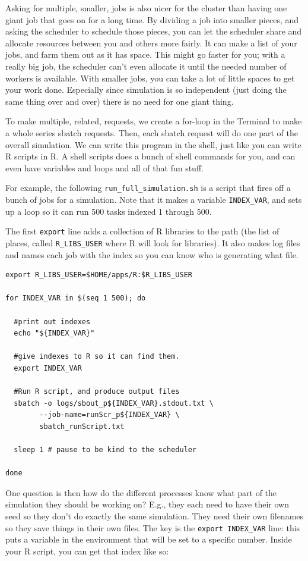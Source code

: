 \documentclass[
]{book}
\begin{document}
Asking for multiple, smaller, jobs is also nicer for the cluster than having one giant job that goes on for a long time.
By dividing a job into smaller pieces, and asking the scheduler to schedule those pieces, you can let the scheduler share and allocate resources between you and others more fairly.
It can make a list of your jobs, and farm them out as it has space.
This might go faster for you; with a really big job, the scheduler can't even allocate it until the needed number of workers is available.
With smaller jobs, you can take a lot of little spaces to get your work done.
Especially since simulation is so independent (just doing the same thing over and over) there is no need for one giant thing.

To make multiple, related, requests, we create a for-loop in the Terminal to make a whole series sbatch requests.
Then, each sbatch request will do one part of the overall simulation.
We can write this program in the shell, just like you can write R scripts in R.
A shell scripts does a bunch of shell commands for you, and can even have variables and loops and all of that fun stuff.

For example, the following \texttt{run\_full\_simulation.sh} is a script that fires off a bunch of jobs for a simulation.
Note that it makes a variable \texttt{INDEX\_VAR}, and sets up a loop so it can run 500 tasks indexed 1 through 500.

The first \texttt{export} line adds a collection of R libraries to the path (the list of places, called \texttt{R\_LIBS\_USER} where R will look for libraries).
It also makes log files and names each job with the index so you can know who is generating what file.

\begin{verbatim}
export R_LIBS_USER=$HOME/apps/R:$R_LIBS_USER

for INDEX_VAR in $(seq 1 500); do

  #print out indexes
  echo "${INDEX_VAR}"

  #give indexes to R so it can find them.
  export INDEX_VAR 

  #Run R script, and produce output files
  sbatch -o logs/sbout_p${INDEX_VAR}.stdout.txt \
        --job-name=runScr_p${INDEX_VAR} \
        sbatch_runScript.txt
  
  sleep 1 # pause to be kind to the scheduler

done
\end{verbatim}

One question is then how do the different processes know what part of the simulation they should be working on?
E.g., they each need to have their own seed so they don't do exactly the same simulation.
They need their own filenames so they save things in their own files.
The key is the \texttt{export\ INDEX\_VAR} line: this puts a variable in the environment that will be set to a specific number.
Inside your R script, you can get that index like so:
\end{document}
